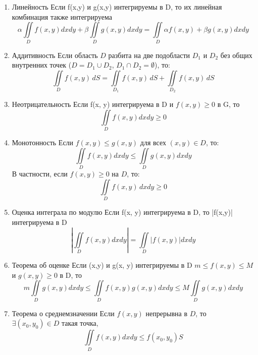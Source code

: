 \documentclass{article}
\begin{document}
\begin{enumerate}
  \item Линейность
    Если f(x,y) и g(x,y) интегрируемы в D, то их линейная комбинация также интегрируема
    \begin{equation}
      \alpha \iint\limits_D f(x,y) dxdy + \beta \iint\limits_D g(x,y) dxdy = \iint\limits_D \alpha f(x,y) + \beta g(x,y) dxdy
    \end{equation}
  \item Аддитивность
    Если область $D$ разбита на две подобласти $D_1$ и $D_2$ без общих внутренних точек
    ($D = D_1 \cup D_2$, $D_1 \cap D_2 = \emptyset$), то:
    \begin{equation}
      \iint\limits_D f(x,y) \, dS =
      \iint\limits_{D_1} f(x,y) \, dS +
      \iint\limits_{D_2} f(x,y) \, dS
    \end{equation}
  \item Неотрицательность
    Если f(x, y) интегрируема в D и $f(x,y) \geq 0$ в G, то
    \begin{equation}
      \iint\limits_D f(x,y) dxdy \geq 0
    \end{equation}
  \item Монотонность
    Если $f(x,y) \leq g(x,y)$ для всех $(x,y) \in D$, то:
    \begin{equation}
      \iint\limits_D f(x,y) dxdy \leq \iint\limits_D g(x,y) dxdy
    \end{equation}
    В частности, если $f(x,y) \geq 0$ на $D$, то:
    \begin{equation}
      \iint\limits_D f(x,y) \, dxdy \geq 0
    \end{equation}
  \item Оценка интеграла по модулю
    Если f(x, y) интегрируема в D, то |f(x,y)| интегрируема в D
    \begin{equation}
      |\iint\limits_D f(x,y)dxdy|  = \iint\limits_D |f(x,y)| dxdy
    \end{equation}
  \item  Теорема об оценке
    Если (x,y) и g(x, y) интегрируемы в D $m \leq f(x,y) \leq M$ и $g(x,y) \geq 0$ в D, то
    \begin{equation}
      m\iint\limits_D g(x,y) dxdy \leq \iint\limits_D f(x,y)g(x,y) dxdy \leq M\iint\limits_D g(x,y) dxdy
    \end{equation}
  \item Теорема о среднемзначении
    Если $f(x, y)$ непрерывна в $D$, то $\exists (x_0, y_0) \in D$ такая точка,
    \begin{equation}
      \iint\limits_D f(x,y) dxdy \leq f(x_0, y_0) S
    \end{equation}
\end{enumerate}
\end{document}
